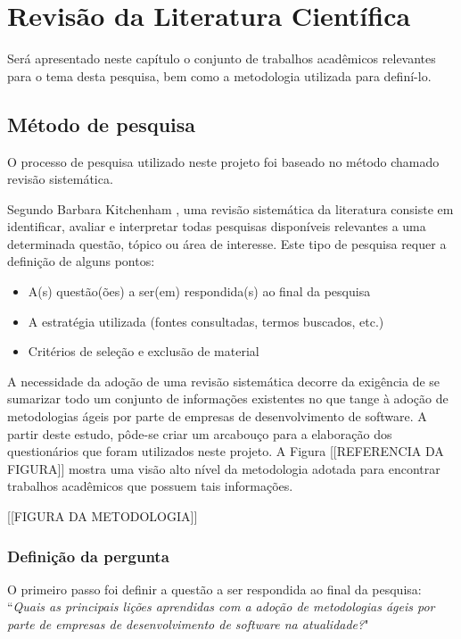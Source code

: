 \chapter{Revisão da Literatura Científica}
	Será apresentado neste capítulo o conjunto de trabalhos acadêmicos relevantes para o tema desta pesquisa, bem como a metodologia utilizada para definí-lo.
	\section{Método de pesquisa}
		O processo de pesquisa utilizado neste projeto foi baseado no método chamado revisão sistemática.
		
		Segundo Barbara Kitchenham \cite{Barbara04}, uma revisão sistemática da literatura consiste em identificar, avaliar e interpretar todas pesquisas disponíveis relevantes a uma determinada questão, tópico ou área de interesse. Este tipo de pesquisa requer a definição de alguns pontos:
		\begin{itemize}
			\item A(s) questão(ões) a ser(em) respondida(s) ao final da pesquisa
			\item A estratégia utilizada (fontes consultadas, termos buscados, etc.)
			\item Critérios de seleção e exclusão de material
		\end{itemize}
		A necessidade da adoção de uma revisão sistemática decorre da exigência de se sumarizar todo um conjunto de informações existentes no que tange à adoção de metodologias ágeis por parte de empresas de desenvolvimento de software. A partir deste estudo, pôde-se criar um arcabouço para a elaboração dos questionários que foram utilizados neste projeto. A Figura [[REFERENCIA DA FIGURA]] mostra uma visão alto nível da metodologia adotada para encontrar trabalhos acadêmicos que possuem tais informações.
		
		[[FIGURA DA METODOLOGIA]]
		
		\subsection{Definição da pergunta}
			O primeiro passo foi definir a questão a ser respondida ao final da pesquisa: ``\textit{Quais as principais lições aprendidas com a adoção de metodologias ágeis por parte de empresas de desenvolvimento de software na atualidade?}"
